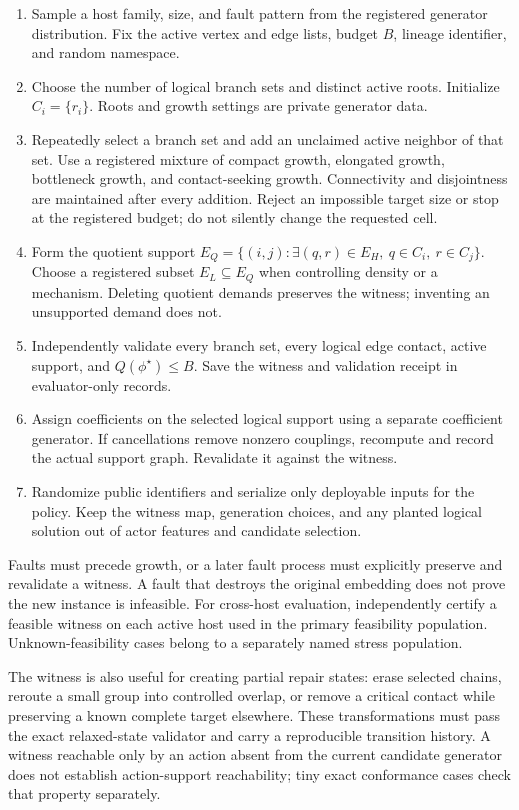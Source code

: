 \documentclass[11pt,a4paper]{article}
\theoremstyle{definition}\newtheorem{definition}[proposition]{Definition}
\begin{document}
\begin{enumerate}
 \item Sample a host family, size, and fault pattern from the registered generator distribution. Fix the active vertex and edge lists, budget $B$, lineage identifier, and random namespace.
 \item Choose the number of logical branch sets and distinct active roots. Initialize $C_i=\{r_i\}$. Roots and growth settings are private generator data.
 \item Repeatedly select a branch set and add an unclaimed active neighbor of that set. Use a registered mixture of compact growth, elongated growth, bottleneck growth, and contact-seeking growth. Connectivity and disjointness are maintained after every addition. Reject an impossible target size or stop at the registered budget; do not silently change the requested cell.
 \item Form the quotient support $E_Q=\{(i,j):\exists(q,r)\in E_H,\ q\in C_i,\ r\in C_j\}$. Choose a registered subset $E_L\subseteq E_Q$ when controlling density or a mechanism. Deleting quotient demands preserves the witness; inventing an unsupported demand does not.
 \item Independently validate every branch set, every logical edge contact, active support, and $Q(\phi^\star)\le B$. Save the witness and validation receipt in evaluator-only records.
 \item Assign coefficients on the selected logical support using a separate coefficient generator. If cancellations remove nonzero couplings, recompute and record the actual support graph. Revalidate it against the witness.
 \item Randomize public identifiers and serialize only deployable inputs for the policy. Keep the witness map, generation choices, and any planted logical solution out of actor features and candidate selection.
\end{enumerate}

Faults must precede growth, or a later fault process must explicitly preserve and revalidate a witness. A fault that destroys the original embedding does not prove the new instance is infeasible. For cross-host evaluation, independently certify a feasible witness on each active host used in the primary feasibility population. Unknown-feasibility cases belong to a separately named stress population.

The witness is also useful for creating partial repair states: erase selected chains, reroute a small group into controlled overlap, or remove a critical contact while preserving a known complete target elsewhere. These transformations must pass the exact relaxed-state validator and carry a reproducible transition history. A witness reachable only by an action absent from the current candidate generator does not establish action-support reachability; tiny exact conformance cases check that property separately.
\end{document}

